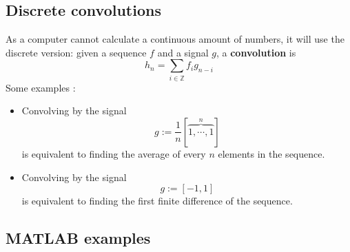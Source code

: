 \documentclass[titlepage]{article}
\theoremstyle{plain}
\theoremstyle{definition}
\begin{document}
		\subsection{Discrete convolutions}
		
		As a computer cannot calculate a continuous amount of numbers, it will use the discrete version: given a sequence $f$ and a signal $g$, a \textbf{convolution} is
		$$
			h_n = \sum_{i \in \mathbb{Z}} f_i g_{n-i}
		$$
		Some examples \cite{Bracewell}:
		\begin{itemize}
			\item Convolving by the signal
			$$
			g := \frac{1}{n}[\overbrace{1,\cdots,1}^{n}]
			$$
			is equivalent to finding the average of every $n$ elements in the sequence.
			
			\item Convolving by the signal
			$$
			g := [-1,1]
			$$
			is equivalent to finding the first finite difference of the sequence.
		\end{itemize}
		
		\subsection{MATLAB examples} \label{matlabConvolutions}
		
\end{document}
